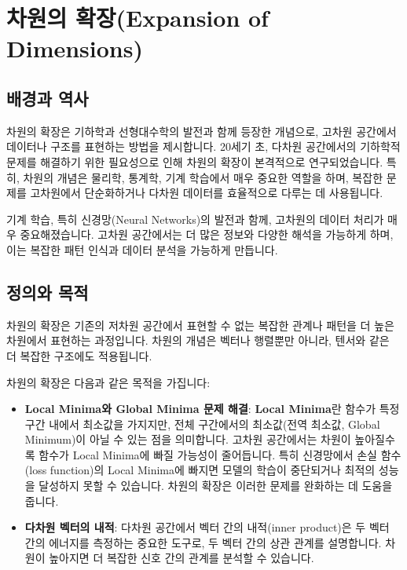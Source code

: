 \section{차원의 확장(Expansion of Dimensions)}

\subsection{배경과 역사}
차원의 확장은 기하학과 선형대수학의 발전과 함께 등장한 개념으로, 고차원 공간에서 데이터나 구조를 표현하는 방법을 제시합니다. 20세기 초, 다차원 공간에서의 기하학적 문제를 해결하기 위한 필요성으로 인해 차원의 확장이 본격적으로 연구되었습니다. 특히, 차원의 개념은 물리학, 통계학, 기계 학습에서 매우 중요한 역할을 하며, 복잡한 문제를 고차원에서 단순화하거나 다차원 데이터를 효율적으로 다루는 데 사용됩니다.

\vspace{1\baselineskip}
\noindent 기계 학습, 특히 신경망(Neural Networks)의 발전과 함께, 고차원의 데이터 처리가 매우 중요해졌습니다. 고차원 공간에서는 더 많은 정보와 다양한 해석을 가능하게 하며, 이는 복잡한 패턴 인식과 데이터 분석을 가능하게 만듭니다.

\subsection{정의와 목적}
차원의 확장은 기존의 저차원 공간에서 표현할 수 없는 복잡한 관계나 패턴을 더 높은 차원에서 표현하는 과정입니다. 차원의 개념은 벡터나 행렬뿐만 아니라, 텐서와 같은 더 복잡한 구조에도 적용됩니다.

\vspace{1\baselineskip}
\noindent 차원의 확장은 다음과 같은 목적을 가집니다:

\begin{itemize}
  \item \textbf{Local Minima와 Global Minima 문제 해결}: \textbf{Local Minima}란 함수가 특정 구간 내에서 최소값을 가지지만, 전체 구간에서의 최소값(전역 최소값, Global Minimum)이 아닐 수 있는 점을 의미합니다. 고차원 공간에서는 차원이 높아질수록 함수가 Local Minima에 빠질 가능성이 줄어듭니다. 특히 신경망에서 손실 함수(loss function)의 Local Minima에 빠지면 모델의 학습이 중단되거나 최적의 성능을 달성하지 못할 수 있습니다. 차원의 확장은 이러한 문제를 완화하는 데 도움을 줍니다.

  \item \textbf{다차원 벡터의 내적}: 다차원 공간에서 벡터 간의 내적(inner product)은 두 벡터 간의 에너지를 측정하는 중요한 도구로, 두 벡터 간의 상관 관계를 설명합니다. 차원이 높아지면 더 복잡한 신호 간의 관계를 분석할 수 있습니다.
\end{itemize}


